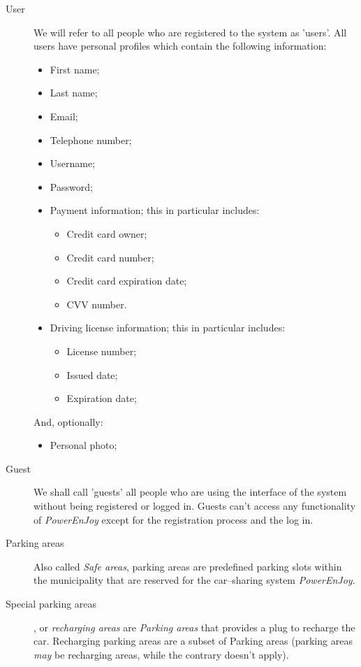 \begin{description}
				\item[User] We will refer to all people who are registered to the system as 'users'. All users have personal profiles which contain the following information:
				\begin{itemize}
					\item First name;
					\item Last name; 
					\item Email;
					\item Telephone number;
					\item Username;
					\item Password;
					\item Payment information; this in particular includes:
						\begin{itemize}
							\item Credit card owner;
							\item Credit card number;
							\item Credit card expiration date;
							\item CVV number.
						\end{itemize}
					\item Driving license information; this in particular includes:
						\begin{itemize}
							\item License number;
							\item Issued date;
							\item Expiration date;
						\end{itemize}
				\end{itemize}
				And, optionally:
				\begin{itemize}		
					\item Personal photo;
				\end{itemize}

				
				\item[Guest] We shall call 'guests' all people who are using the interface of the system without being registered or logged in. Guests can't access any functionality of \textit{PowerEnJoy} except for the registration process and the log in. 
				
				
				\item[Parking areas] Also called \textit{Safe areas}, parking areas are predefined parking slots within the municipality that are reserved for the car–sharing system \textit{PowerEnJoy}.
				\item[Special parking areas], or \textit{recharging areas} are \textit{Parking areas} that provides a plug to recharge the car. Recharging parking areas are a subset of Parking areas (parking areas \textit{may} be recharging areas, while the contrary doesn't apply).
				

\end{description}

